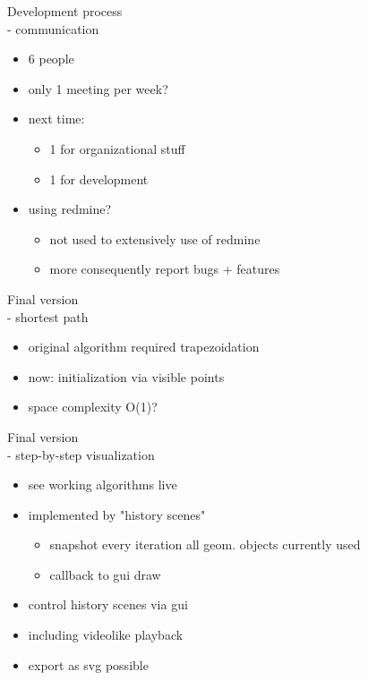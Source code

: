 \documentclass[ucs,9ptb]{beamer}
\begin{document}
\begin{frame}{Development process\\- communication}
  \begin{itemize}
    \item 6 people
    \item only 1 meeting per week?
    \item next time:
    \begin{itemize}
      \item 1 for organizational stuff
      \item 1 for development
    \end{itemize}
    \item using redmine?
    \begin{itemize}
      \item not used to extensively use of redmine
      \item more consequently report bugs + features
    \end{itemize}
  \end{itemize}
\end{frame}


\begin{frame}{Final version\\- shortest path}
  \begin{itemize}    
    \item original algorithm required trapezoidation
    \item now: initialization via visible points
    \item space complexity O(1)?
  \end{itemize}
\end{frame}

\begin{frame}{Final version\\- step-by-step visualization}
  \begin{itemize}
    \item see working algorithms live
    \item implemented by "history scenes"
    \begin{itemize}
      \item snapshot every iteration 
            all geom. objects currently used
      \item callback to gui draw
    \end{itemize}
    \item control history scenes via gui
    \item including videolike playback
    \item export as svg possible
  \end{itemize}
\end{frame}
\end{document}

